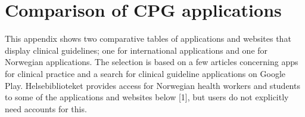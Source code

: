 \documentclass[a4paper,12pt]{book}
\begin{document}
\backmatter
\printbibliography


\appendix
\chapter{Comparison of CPG applications}\label{appendix:ComparisonApps}
This appendix shows two comparative tables of applications and websites that display clinical guidelines; one for international applications and one for Norwegian applications. The selection is based on a few articles concerning apps for clinical practice and a search for clinical guideline applications on Google Play.
Helsebiblioteket provides access for Norwegian health workers and students to some of the applications and websites below [1], but users do not explicitly need accounts for this.

\end{document}

